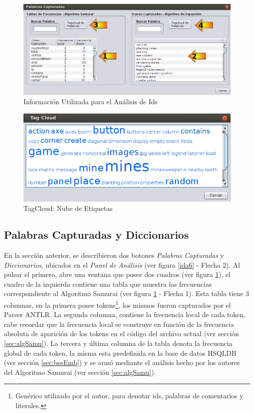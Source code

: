 \begin{figure}[t] %
\centerline{%
\includegraphics[scale= 0.55]{./cap4/ida_07.png}
}
\caption{Información Utilizada para el Análisis de Ids}
\label{ida7}
\end{figure}

\begin{figure}[t] %
\centerline{%
\includegraphics[scale= 0.75]{./cap4/ida_08.png}
}
\caption{TagCloud: Nube de Etiquetas}
\label{ida8}
\end{figure}

\subsection{Palabras Capturadas y Diccionarios}
\label{sec:panPalDicc}

En la sección anterior, se describieron dos botones \textit{Palabras Capturadas} y \textit{Diccionarios}, ubicados en el \textit{Panel de Análisis} (ver figura \ref{ida6} - Flecha 2). Al pulsar el primero, abre una ventana que posee dos cuadros (ver figura \ref{ida7}), el cuadro de la izquierda contiene una tabla que muestra las frecuencias correspondiente al Algoritmo Samurai (ver figura \ref{ida7} - Flecha 1). Esta tabla tiene 3 columnas, en la primera posee tokens\footnote[1]{Genérico utilizado por el autor, para denotar ids, palabras de comentarios y literales.}, los mismos fueron capturados por el Parser ANTLR. La segunda columna, contiene la frecuencia local de cada token, cabe recordar que la frecuencia local se construye en función de la frecuencia absoluta de aparición de los tokens en el código del archivo actual (ver sección \ref{sec:algSamu}). La tercera y última columna de la tabla denota la frecuencia global de cada token, la misma esta predefinida en la base de datos HSQLDB (ver sección \ref{sec:bseEmb}) y se armó mediante el análisis hecho por los autores del Algoritmo Samurai (ver sección \ref{sec:algSamu}).


